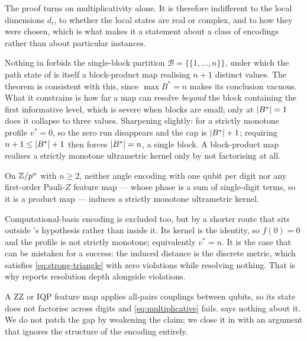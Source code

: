 The proof turns on multiplicativity alone. It is therefore indifferent to the local
dimensions $d_i$, to whether the local states are real or complex, and to how they were
chosen, which is what makes it a statement about a class of encodings rather than about
particular instances.

\begin{remark}
  \label{rem:block-tightness}
  Nothing in  forbids the single-block partition
  $\mathcal{B} = \{\{1, \dots, n\}\}$, under which the path state of
   is itself a block-product map realising $n+1$ distinct values.
  The theorem is consistent with this, since $\max B^{*} = n$ makes its conclusion
  vacuous. What it constrains is how far a map can resolve \emph{beyond} the block
  containing the first informative level, which is severe when blocks are small; only at
  $\lvert B^{*}\rvert = 1$ does it collapse to three values. Sharpening slightly: for a
  strictly monotone profile $v^{*} = 0$, so the zero run disappears and the cap is
  $\lvert B^{*}\rvert + 1$; requiring $n+1 \le \lvert B^{*}\rvert + 1$ then forces
  $\lvert B^{*}\rvert = n$, a single block. A block-product map realises a strictly monotone
  ultrametric kernel only by not factorising at all.
\end{remark}

\begin{corollary}
  \label{cor:standard-encodings}
  On $\mathbb{Z}/p^{n}$ with $n \ge 2$, neither angle encoding with one qubit per digit nor any
  first-order Pauli-$Z$ feature map --- whose phase is a sum of single-digit terms, so
  it is a product map --- induces a strictly monotone ultrametric kernel.
\end{corollary}

Computational-basis encoding is excluded too, but by a shorter route that sits outside
's hypothesis rather than inside it. Its kernel is the identity,
so $f(0) = 0$ and the profile is not strictly monotone; equivalently $v^{*} = n$. It is
the case that can be mistaken for a success: the induced distance is the discrete
metric, which satisfies \cref{eq:strong-triangle} with zero violations while resolving
nothing. That is why  reports resolution depth alongside
violations.

\begin{remark}
  \label{rem:not-covered}
  A ZZ or IQP feature map applies all-pairs couplings between qubits, so its state does
  not factorise across digits and \cref{eq:multiplicative} fails.
   says nothing about it. We do not patch the gap by weakening
  the claim; we close it in  with an argument that ignores the
  structure of the encoding entirely.
\end{remark}

